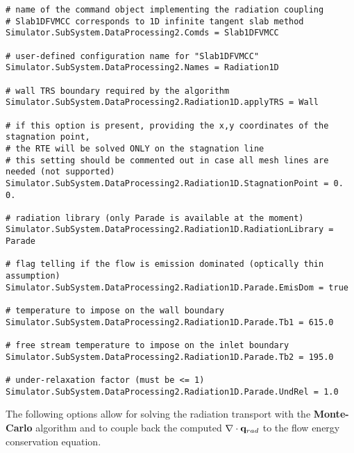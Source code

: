 \documentclass[11pt]{article}
\begin{document}
\begin{verbatim}
# name of the command object implementing the radiation coupling
# Slab1DFVMCC corresponds to 1D infinite tangent slab method
Simulator.SubSystem.DataProcessing2.Comds = Slab1DFVMCC

# user-defined configuration name for "Slab1DFVMCC"
Simulator.SubSystem.DataProcessing2.Names = Radiation1D

# wall TRS boundary required by the algorithm 
Simulator.SubSystem.DataProcessing2.Radiation1D.applyTRS = Wall

# if this option is present, providing the x,y coordinates of the stagnation point,
# the RTE will be solved ONLY on the stagnation line
# this setting should be commented out in case all mesh lines are needed (not supported)
Simulator.SubSystem.DataProcessing2.Radiation1D.StagnationPoint = 0. 0.

# radiation library (only Parade is available at the moment)
Simulator.SubSystem.DataProcessing2.Radiation1D.RadiationLibrary = Parade

# flag telling if the flow is emission dominated (optically thin assumption) 
Simulator.SubSystem.DataProcessing2.Radiation1D.Parade.EmisDom = true

# temperature to impose on the wall boundary 
Simulator.SubSystem.DataProcessing2.Radiation1D.Parade.Tb1 = 615.0

# free stream temperature to impose on the inlet boundary 
Simulator.SubSystem.DataProcessing2.Radiation1D.Parade.Tb2 = 195.0

# under-relaxation factor (must be <= 1)
Simulator.SubSystem.DataProcessing2.Radiation1D.Parade.UndRel = 1.0
\end{verbatim}

The following options allow for solving the radiation transport with the \textbf{Monte-Carlo} algorithm 
and to couple back the computed $\nabla \cdot {\bf q}_{rad}$ to the flow energy conservation equation. 
\end{document}
